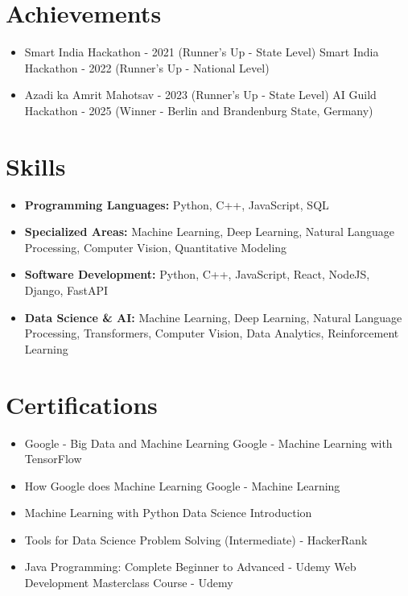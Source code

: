 \documentclass[a4paper,10pt]{article}
\begin{document}
\section*{Achievements}
\begin{itemize}
\item Smart India Hackathon - 2021 (Runner's Up - State Level) \hfill Smart India Hackathon - 2022 (Runner's Up - National Level)
\item Azadi ka Amrit Mahotsav - 2023 (Runner's Up - State Level) \hfill AI Guild Hackathon - 2025 (Winner - Berlin and Brandenburg State, Germany)
\end{itemize}

\section*{Skills}
\begin{itemize}
  \item \textbf{Programming Languages:} Python, C++, JavaScript, SQL
  \item \textbf{Specialized Areas:} Machine Learning, Deep Learning, Natural Language Processing, Computer Vision, Quantitative Modeling
  \item \textbf{Software Development:} Python, C++, JavaScript, React, NodeJS, Django, FastAPI
  \item \textbf{Data Science \& AI:} Machine Learning, Deep Learning, Natural Language Processing, Transformers, Computer Vision, Data Analytics, Reinforcement Learning
\end{itemize}

\section*{Certifications}
\begin{itemize}
\item Google - Big Data and Machine Learning \hfill Google - Machine Learning with TensorFlow
\item How Google does Machine Learning \hfill Google - Machine Learning
\item Machine Learning with Python \hfill Data Science Introduction
\item Tools for Data Science \hfill Problem Solving (Intermediate) - HackerRank
\item Java Programming: Complete Beginner to Advanced - Udemy \hfill Web Development Masterclass Course - Udemy
\end{itemize}
\end{document}
